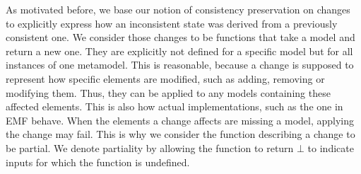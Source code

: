 As motivated before, we base our notion of consistency preservation on changes to explicitly express how an inconsistent state was derived from a previously consistent one.
We consider those changes to be functions that take a model and return a new one.
They are explicitly not defined for a specific model but for all instances of one metamodel.
This is reasonable, because a change is supposed to represent how specific elements are modified, such as adding, removing or modifying them.
Thus, they can be applied to any models containing these affected elements.
This is also how actual implementations, such as the one in \gls{EMF} behave.
When the elements a change affects are missing a model, applying the change may fail.
This is why we consider the function describing a change to be partial.
We denote partiality by allowing the function to return $\bot$ to indicate inputs for which the function is undefined.
